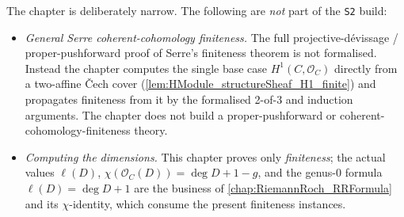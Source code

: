 The chapter is deliberately narrow. The following are \emph{not} part of
the \texttt{S2} build:
\begin{itemize}
  \item \emph{General Serre coherent-cohomology finiteness.} The full
    projective-dévissage / proper-pushforward proof of Serre's
    finiteness theorem is not formalised. Instead the chapter computes
    the single base case \(H^1(C, \mathcal O_C)\) directly from a
    two-affine Čech cover (\cref{lem:HModule_structureSheaf_H1_finite})
    and propagates finiteness from it by the formalised 2-of-3 and
    induction arguments. The chapter does not build a proper-pushforward
    or coherent-cohomology-finiteness theory.
  \item \emph{Computing the dimensions.} This chapter proves only
    \emph{finiteness}; the actual values \(\ell(D)\), \(\chi(\mathcal
    O_C(D)) = \deg D + 1 - g\), and the genus-\(0\) formula
    \(\ell(D) = \deg D + 1\) are the business of
    \cref{chap:RiemannRoch_RRFormula} and its
    \(\chi\)-identity, which consume the present finiteness instances.
\end{itemize}
